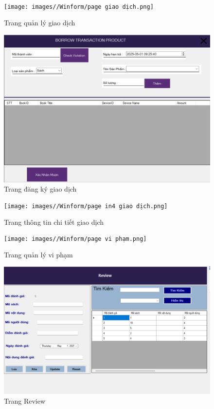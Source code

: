 \documentclass{article}
\begin{document}
\begin{figure} [H]
    \centering
    \texttt{[image: images//Winform/page giao dịch.png]}
    \caption{Trang quản lý giao dịch}
    \label{fig:enter-label}
\end{figure}

\begin{figure} [H]
    \centering
    \includegraphics[width=1\linewidth]{images/Winform/page đk giao dịch.png}
    \caption{Trang đăng ký giao dịch}
    \label{fig:enter-label}
\end{figure}

\begin{figure} [H]
    \centering
    \texttt{[image: images//Winform/page in4 giao dịch.png]}
    \caption{Trang thông tin chi tiết giao dịch}
    \label{fig:enter-label}
\end{figure}

\begin{figure} [H]
    \centering
    \texttt{[image: images//Winform/page vi phạm.png]}
    \caption{Trang quản lý vi phạm}
    \label{fig:enter-label}
\end{figure}

\begin{figure} [H]
    \centering
    \includegraphics[width=1\linewidth]{images//Winform/page review.png}
    \caption{Trang Review}
    \label{fig:enter-label}
\end{figure}
\end{document}
